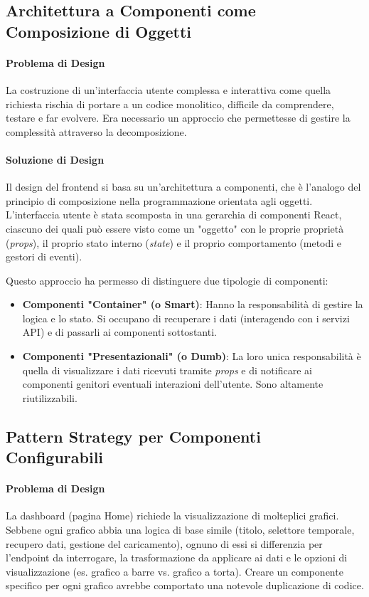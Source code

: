 \documentclass[12pt,a4paper,openright,twoside]{book}
\begin{document}
\subsection{Architettura a Componenti come Composizione di Oggetti}
\label{subsec:design_component_composition}

\paragraph{Problema di Design}
La costruzione di un'interfaccia utente complessa e interattiva come quella richiesta rischia di portare a un codice monolitico, difficile da comprendere, testare e far evolvere. Era necessario un approccio che permettesse di gestire la complessità attraverso la decomposizione.

\paragraph{Soluzione di Design}
Il design del frontend si basa su un'architettura a componenti, che è l'analogo del principio di composizione nella programmazione orientata agli oggetti. L'interfaccia utente è stata scomposta in una gerarchia di componenti React, ciascuno dei quali può essere visto come un "oggetto" con le proprie proprietà (\textit{props}), il proprio stato interno (\textit{state}) e il proprio comportamento (metodi e gestori di eventi).

Questo approccio ha permesso di distinguere due tipologie di componenti:
\begin{itemize}
    \item \textbf{Componenti "Container" (o Smart)}: Hanno la responsabilità di gestire la logica e lo stato. Si occupano di recuperare i dati (interagendo con i servizi API) e di passarli ai componenti sottostanti.
    \item \textbf{Componenti "Presentazionali" (o Dumb)}: La loro unica responsabilità è quella di visualizzare i dati ricevuti tramite \textit{props} e di notificare ai componenti genitori eventuali interazioni dell'utente. Sono altamente riutilizzabili.
\end{itemize}

\subsection{Pattern Strategy per Componenti Configurabili}
\label{subsec:design_strategy_frontend}

\paragraph{Problema di Design}
La dashboard (pagina Home) richiede la visualizzazione di molteplici grafici. Sebbene ogni grafico abbia una logica di base simile (titolo, selettore temporale, recupero dati, gestione del caricamento), ognuno di essi si differenzia per l'endpoint da interrogare, la trasformazione da applicare ai dati e le opzioni di visualizzazione (es. grafico a barre vs. grafico a torta). Creare un componente specifico per ogni grafico avrebbe comportato una notevole duplicazione di codice.
\end{document}
